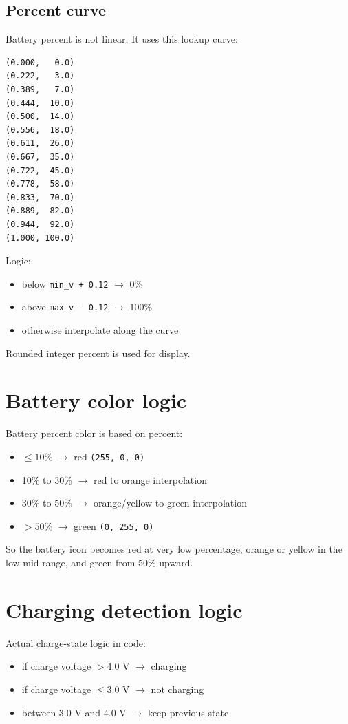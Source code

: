 \documentclass[11pt]{article}
\begin{document}
\subsection{Percent curve}
Battery percent is not linear. It uses this lookup curve:
\begin{lstlisting}
(0.000,   0.0)
(0.222,   3.0)
(0.389,   7.0)
(0.444,  10.0)
(0.500,  14.0)
(0.556,  18.0)
(0.611,  26.0)
(0.667,  35.0)
(0.722,  45.0)
(0.778,  58.0)
(0.833,  70.0)
(0.889,  82.0)
(0.944,  92.0)
(1.000, 100.0)
\end{lstlisting}

Logic:
\begin{itemize}
  \item below \texttt{min\_v + 0.12} $\rightarrow$ 0\%
  \item above \texttt{max\_v - 0.12} $\rightarrow$ 100\%
  \item otherwise interpolate along the curve
\end{itemize}
Rounded integer percent is used for display.

\section{Battery color logic}
Battery percent color is based on percent:
\begin{itemize}
  \item $\leq 10\%$ $\rightarrow$ red \texttt{(255, 0, 0)}
  \item 10\% to 30\% $\rightarrow$ red to orange interpolation
  \item 30\% to 50\% $\rightarrow$ orange/yellow to green interpolation
  \item $> 50\%$ $\rightarrow$ green \texttt{(0, 255, 0)}
\end{itemize}

So the battery icon becomes red at very low percentage, orange or yellow in the low-mid range, and green from 50\% upward.

\section{Charging detection logic}
Actual charge-state logic in code:
\begin{itemize}
  \item if charge voltage $> 4.0$ V $\rightarrow$ charging
  \item if charge voltage $\leq 3.0$ V $\rightarrow$ not charging
  \item between 3.0 V and 4.0 V $\rightarrow$ keep previous state
\end{itemize}
\end{document}
